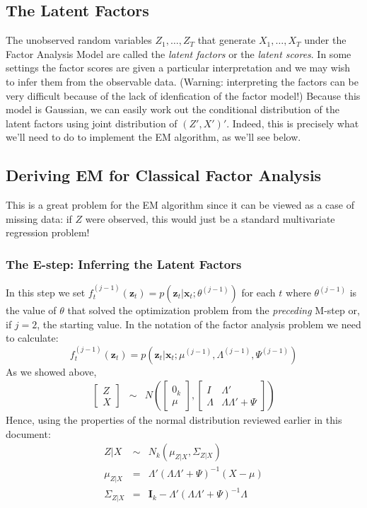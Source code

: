 \documentclass[12pt]{article}
\theoremstyle{definition}
\begin{document}
\subsection{The Latent Factors}
The unobserved random variables $Z_1, \hdots, Z_T$ that generate $X_1, \hdots, X_T$ under the Factor Analysis Model are called the \emph{latent factors} or the \emph{latent scores}. In some settings the factor scores are given a particular interpretation and we may wish to infer them from the observable data. (Warning: interpreting the factors can be very difficult because of the lack of idenfication of the factor model!) Because this model is Gaussian, we can easily work out the conditional distribution of the latent factors using joint distribution of $(Z',X')'$. Indeed, this is precisely what we'll need to do to implement the EM algorithm, as we'll see below. 


\subsection{Deriving EM for Classical Factor Analysis}
This is a great problem for the EM algorithm since it can be viewed as a case of missing data: if $Z$ were observed, this would just be a standard multivariate regression problem!


\subsubsection{The E-step: Inferring the Latent Factors} In this step we set $f_t^{(j-1)}(\mathbf{z}_t) = p(\mathbf{z}_t|\mathbf{x}_t; \theta^{(j-1)})$ for each $t$ where $\theta^{(j-1)}$ is the value of $\theta$ that solved the optimization problem from the \emph{preceding} M-step or, if $j=2$, the starting value. In the notation of the factor analysis problem we need to calculate:
	$$f_t^{(j-1)}(\mathbf{z}_t) = p(\mathbf{z}_t | \mathbf{x}_t; \mu^{(j-1)}, \Lambda^{(j-1)}, \Psi^{(j-1)})$$
As we showed above,
	\begin{eqnarray*}
		\left[\begin{array}{c}
			Z\\ X
		\end{array}\right] 
		&\sim&  N\left(
		\left[\begin{array}{c}
			0_k \\ \mu
	\end{array}\right], 
		\left[\begin{array}{cc}
			I & \Lambda'\\
			\Lambda & \Lambda \Lambda' + \Psi
		\end{array} \right] \right)
	\end{eqnarray*}
Hence, using the properties of the normal distribution reviewed earlier in this document:
	\begin{eqnarray*}
		Z|X &\sim& N_k(\mu_{Z|X}, \Sigma_{Z|X})\\
		\mu_{Z|X} &=& \Lambda' (\Lambda \Lambda' + \Psi)^{-1}(X - \mu) \\
		\Sigma_{Z|X} &=& \mathbf{I}_k - \Lambda'(\Lambda \Lambda' + \Psi)^{-1}\Lambda
	\end{eqnarray*}
\end{document}
